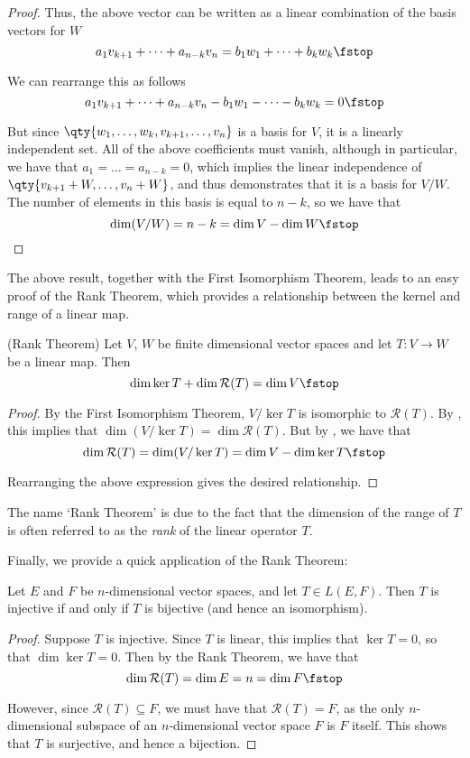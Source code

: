 \begin{proof}
   Thus, the above vector can be written as a linear combination of the basis vectors for \( W \)
   \[ a_1v_{k+1}+\dots+a_{n-k}v_n=b_1w_1+\dots+b_kw_k\fstop \]

   We can rearrange this as follows
   \[ a_1v_{k+1}+\dots+a_{n-k}v_n-b_1w_1-\dots-b_kw_k=0\fstop \]

   But since \( \qty{w_1,\dots,w_k,v_{k+1},\dots,v_n} \) is a basis for \( V \), it is a linearly independent set. All of the above coefficients must vanish, although in particular, we have that \( a_1=\dots=a_{n-k}=0 \), which implies the linear independence of \( \qty{v_{k+1}+W,\dots,v_n+W} \), and thus demonstrates that it is a basis for \( V/W \). The number of elements in this basis is equal to \( n-k \), so we have that
   \[ \dim(V/W)=n-k=\dim V-\dim W\fstop \]
 \end{proof}

 The above result, together with the First Isomorphism Theorem, leads to an easy proof of the Rank Theorem, which provides a relationship between the kernel and range of a linear map.
 
 \begin{theorem}
   (Rank Theorem) Let \( V \), \( W \) be finite dimensional vector spaces and let \( T:V\to W \) be a linear map. Then
   \[ \dim\ker T+\dim\mathcal{R}(T)=\dim V\fstop \]
 \end{theorem}
 \begin{proof}
   By the First Isomorphism Theorem, \( V/\ker T \) is isomorphic to \( \mathcal{R}(T) \). By , this implies that \( \dim (V/\ker T)=\dim\mathcal{R}(T) \). But by , we have that
   \[ \dim\mathcal{R}(T)=\dim (V/\ker T)=\dim V-\dim\ker T\fstop \]

   Rearranging the above expression gives the desired relationship.
 \end{proof}

 The name `Rank Theorem' is due to the fact that the dimension of the range of \( T \) is often referred to as the \emph{rank} of the linear operator \( T \).

 \vspace{3mm}
 
 Finally, we provide a quick application of the Rank Theorem:
 \begin{proposition}
   Let \( E \) and \( F \) be \( n \)-dimensional vector spaces, and let \( T\in L(E,F) \). Then \( T \) is injective if and only if \( T \) is bijective (and hence an isomorphism).
 \end{proposition}
 \begin{proof}
   Suppose \( T \) is injective. Since \( T \) is linear, this implies that \( \ker T=\qty{0} \), so that \( \dim\ker T=0 \). Then by the Rank Theorem, we have that
   \[ \dim\mathcal{R}(T)=\dim E=n=\dim F\fstop \]

   However, since \( \mathcal{R}(T)\subseteq F \), we must have that \( \mathcal{R}(T)=F \), as the only \( n \)-dimensional subspace of an \( n \)-dimensional vector space \( F \) is \( F \) itself. This shows that \( T \) is surjective, and hence a bijection.
 \end{proof}

